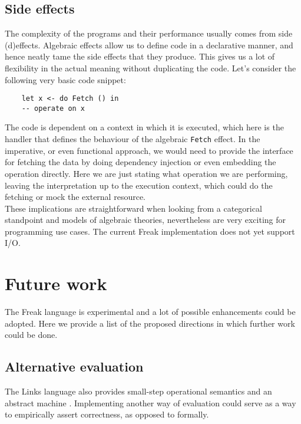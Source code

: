 \documentclass{article}
\theoremstyle{definition}
\theoremstyle{lemma}
\theoremstyle{observation}
\theoremstyle{theorem}
\begin{document}
    \subsection{Side effects}

    The complexity of the programs and their performance usually comes from side (d)effects.
    Algebraic effects allow us to define code in a declarative manner, and hence
    neatly tame the side effects that they produce. This gives us a lot of flexibility
    in the actual meaning without duplicating the code. Let's consider the following
    very basic code snippet:

    \begin{verbatim}
    let x <- do Fetch () in
    -- operate on x
    \end{verbatim}

    The code is dependent on a context in which it is executed, which here is
    the handler that defines the behaviour of the algebraic \verb!Fetch! effect.
    In the imperative, or even functional approach, we would need to provide
    the interface for fetching the data by doing dependency injection or even
    embedding the operation directly. Here we are just stating what operation
    we are performing, leaving the interpretation up to the execution context,
    which could do the fetching or mock the external resource. \\

    These implications are straightforward when looking from a categorical
    standpoint and models of algebraic theories, nevertheless are very exciting
    for programming use cases. The current Freak implementation does not yet support I/O.

\section{Future work}

    The Freak language is experimental and a lot of possible enhancements
    could be adopted. Here we provide a list of the proposed directions in which
    further work could be done.

    \subsection{Alternative evaluation}

    The Links language also provides small-step operational semantics and
    an abstract machine \cite{liberating-effects}. Implementing another way
    of evaluation could serve as a way to empirically assert correctness,
    as opposed to formally.
\end{document}

